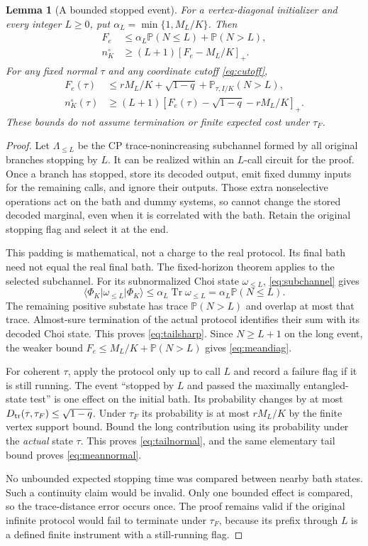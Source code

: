 \documentclass[11pt]{article}
\newtheorem{lemma}[theorem]{Lemma}
\newcommand{\Tr}{\operatorname{Tr}}
\newcommand{\ket}[1]{\lvert #1\rangle}
\newcommand{\bra}[1]{\langle #1\rvert}
\newcommand{\D}{D_{\rm tr}}
\newcommand{\Prob}{\mathbb P}
\begin{document}
\begin{lemma}[A bounded stopped event]\label{lem:stopped}
For a vertex-diagonal initializer and every integer $L\ge0$, put
$\alpha_L=\min\{1,M_L/K\}$. Then
\begin{align}
 F_e&\le\alpha_L\Prob(N\le L)+\Prob(N>L),\label{eq:tailsharp}\\
 n_K^\circ&\ge(L+1)[F_e-M_L/K]_+.\label{eq:meandiag}
\end{align}
For any fixed normal $\tau$ and any coordinate cutoff \eqref{eq:cutoff},
\begin{align}
 F_e(\tau)&\le rM_L/K+\sqrt{1-q}+\Prob_{\tau,I/K}(N>L),\label{eq:tailnormal}\\
 n_K^\circ(\tau)&\ge(L+1)[F_e(\tau)-\sqrt{1-q}-rM_L/K]_+.\label{eq:meannormal}
\end{align}
These bounds do not assume termination or finite expected cost under $\tau_F$.
\end{lemma}
\begin{proof}
Let $\Lambda_{\le L}$ be the CP trace-nonincreasing subchannel formed by all original branches stopping by $L$. It can be realized within an $L$-call circuit for the proof. Once a branch has stopped, store its decoded output, emit fixed dummy inputs for the remaining calls, and ignore their outputs. Those extra nonselective operations act on the bath and dummy systems, so cannot change the stored decoded marginal, even when it is correlated with the bath. Retain the original stopping flag and select it at the end.

This padding is mathematical, not a charge to the real protocol. Its final bath need not equal the real final bath. The fixed-horizon theorem applies to the selected subchannel. For its subnormalized Choi state $\omega_{\le L}$, \eqref{eq:subchannel} gives
\[
 \bra{\Phi_K}\omega_{\le L}\ket{\Phi_K}\le
 \alpha_L\Tr\omega_{\le L}=\alpha_L\Prob(N\le L).
\]
The remaining positive substate has trace $\Prob(N>L)$ and overlap at most that trace. Almost-sure termination of the actual protocol identifies their sum with its decoded Choi state. This proves \eqref{eq:tailsharp}. Since $N\ge L+1$ on the long event, the weaker bound $F_e\le M_L/K+\Prob(N>L)$ gives \eqref{eq:meandiag}.

For coherent $\tau$, apply the protocol only up to call $L$ and record a failure flag if it is still running. The event ``stopped by $L$ and passed the maximally entangled-state test'' is one effect on the initial bath. Its probability changes by at most $\D(\tau,\tau_F)\le\sqrt{1-q}$. Under $\tau_F$ its probability is at most $rM_L/K$ by the finite vertex support bound. Bound the long contribution using its probability under the \emph{actual} state $\tau$. This proves \eqref{eq:tailnormal}, and the same elementary tail bound proves \eqref{eq:meannormal}.

No unbounded expected stopping time was compared between nearby bath states. Such a continuity claim would be invalid. Only one bounded effect is compared, so the trace-distance error occurs once. The proof remains valid if the original infinite protocol would fail to terminate under $\tau_F$, because its prefix through $L$ is a defined finite instrument with a still-running flag.
\end{proof}
\end{document}
